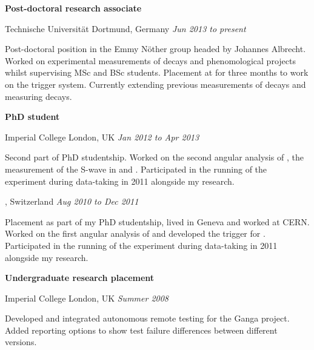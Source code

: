 \documentclass[10pt]{article}
\renewenvironment{compactitem}{
  \begin{list}{}{
    \setlength{\leftmargin}{1em}
    \setlength{\pltopsep}{\smallskipamount}
    \setlength{\plitemsep}{0.1pt}
\setlength{\plparsep}{0.1pt}
  }
}{
  \end{list}
}
\def\tud{Technische Universit\"at Dortmund}
\def\icl{Imperial College London}
\begin{document}
\textbf{Post-doctoral research associate}
\begin{compactitem}
\item {\tud, Germany}  \hfill \textit{Jun 2013 to present}
\begin{compactitem}
\item Post-doctoral position in the Emmy N\"other group headed by Johannes Albrecht. %
Worked on experimental measurements of \btosll decays and phenomological projects whilst supervising MSc and BSc students.
Placement at \cern for three months to work on the \lhcb trigger system.
Currently extending previous measurements of \btosll decays and measuring \btodll decays.
\end{compactitem}
\end{compactitem}

\textbf{PhD student}
\begin{compactitem}
\item \icl, UK    \hfill \textit{Jan 2012 to Apr 2013}
\begin{compactitem}
\item Second part of PhD studentship.
Worked on the second angular analysis of \BdKstmm, the measurement of the \kpi S-wave in \BdKstmm and .
Participated in the running of the \lhcb experiment during data-taking in 2011 alongside my research. 
\end{compactitem}
\cern, Switzerland   \hfill \textit{Aug 2010 to Dec 2011}
\begin{compactitem}
\item Placement as part of my PhD studentship, lived in Geneva and worked at CERN.
Worked on the first angular analysis of \BdKstmm and developed the trigger for \lhcb.
Participated in the running of the \lhcb experiment during data-taking in 2011 alongside my research. 
\end{compactitem}
\end{compactitem}

\textbf{Undergraduate research placement} 
\begin{compactitem}
\item \icl, UK    \hfill \textit{Summer 2008}
\begin{compactitem}
\item Developed and integrated autonomous remote testing for the Ganga project.  
Added reporting options to show test failure differences between different versions.
\end{compactitem}
\end{compactitem}
\end{document}
